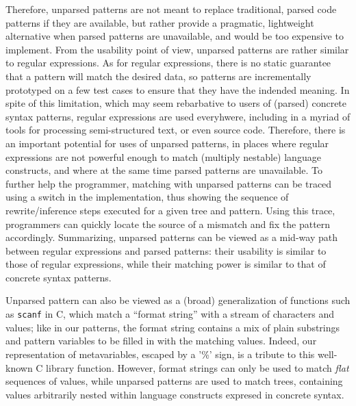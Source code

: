 Therefore, unparsed patterns are not meant to replace traditional,
parsed code patterns if they are available, but rather provide a
pragmatic, lightweight alternative when parsed patterns are
unavailable, and would be too expensive to implement. From the
usability point of view, unparsed patterns are rather similar to
regular expressions. As for regular expressions, there is no static
guarantee that a pattern will match the desired data, so patterns are
incrementally prototyped on a few test cases to ensure that they have
the indended meaning. In spite of this limitation, which may seem
rebarbative to users of (parsed) concrete syntax patterns, regular
expressions are used everyhwere, including in a myriad of tools for
processing semi\hyp{}structured text, or even source code. Therefore,
there is an important potential for uses of unparsed patterns, in
places where regular expressions are not powerful enough to match
(multiply nestable) language constructs, and where at the same time
parsed patterns are unavailable. To further help the programmer,
matching with unparsed patterns can be traced using a switch in the
implementation, thus showing the sequence of rewrite/\-inference steps
executed for a given tree and pattern. Using this trace, programmers
can quickly locate the source of a mismatch and fix the pattern
accordingly. Summarizing, unparsed patterns can be viewed as a
mid\hyp{}way path between regular expressions and parsed patterns:
their usability is similar to those of regular expressions, while
their matching power is similar to that of concrete syntax patterns.

Unparsed pattern can also be viewed as a (broad) generalization of
functions such as \verb|scanf| in C, which match a ``format string''
with a stream of characters and values; like in our patterns, the
format string contains a mix of plain substrings and pattern variables
to be filled in with the matching values. Indeed, our representation
of meta\-variables, escaped by a '\%' sign, is a tribute to this
well\hyp{}known C library function. However, format strings can only
be used to match \emph{flat} sequences of values, while unparsed
patterns are used to match trees, containing values arbitrarily nested
within language constructs expresed in concrete syntax.

